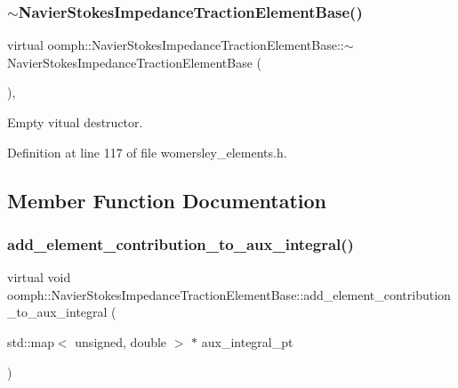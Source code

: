 \subsubsection{\texorpdfstring{$\sim$\+Navier\+Stokes\+Impedance\+Traction\+Element\+Base()}{~NavierStokesImpedanceTractionElementBase()}}
{\footnotesize\ttfamily virtual oomph\+::\+Navier\+Stokes\+Impedance\+Traction\+Element\+Base\+::$\sim$\+Navier\+Stokes\+Impedance\+Traction\+Element\+Base (\begin{DoxyParamCaption}{ }\end{DoxyParamCaption})\hspace{0.3cm}{\ttfamily [inline]}, {\ttfamily [virtual]}}



Empty vitual destructor. 



Definition at line 117 of file womersley\+\_\+elements.\+h.



\subsection{Member Function Documentation}
\mbox{\label{classoomph_1_1NavierStokesImpedanceTractionElementBase_a4ce2150b59ff999c24e623b645f1c899}} 
\subsubsection{\texorpdfstring{add\+\_\+element\+\_\+contribution\+\_\+to\+\_\+aux\+\_\+integral()}{add\_element\_contribution\_to\_aux\_integral()}}
{\footnotesize\ttfamily virtual void oomph\+::\+Navier\+Stokes\+Impedance\+Traction\+Element\+Base\+::add\+\_\+element\+\_\+contribution\+\_\+to\+\_\+aux\+\_\+integral (\begin{DoxyParamCaption}\item[{std\+::map$<$ unsigned, double $>$ $\ast$}]{aux\+\_\+integral\+\_\+pt }\end{DoxyParamCaption})\hspace{0.3cm}{\ttfamily [pure virtual]}}



